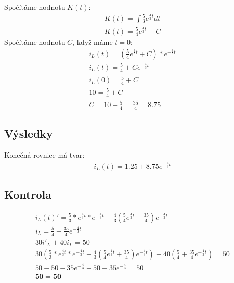 Spočítáme hodnotu $K(t)$:
\begin{gather*}
K(t) = \int \frac{5}{3}e^{\frac{4}{3}t}dt \\
K(t) = \frac{5}{4}e^{\frac{4}{3}t} + C
\end{gather*}
Spočítáme hodnotu $C$, když máme $t=0$:
\begin{gather*}
i_L(t) = (\frac{5}{4}e^{\frac{4}{3}t} + C) * e^{-\frac{4}{3}t} \\
i_L(t) = \frac{5}{4} + Ce^{-\frac{4}{3}t} \\
i_L(0) = \frac{5}{4} + C \\
10 = \frac{5}{4} + C \\
C = 10 - \frac{5}{4} = \frac{35}{4} = 8.75
\end{gather*}
\subsection{Výsledky}
Konečná rovnice má tvar:
\begin{gather*}
i_L(t) = 1.25+8.75e^{-\frac{4}{3}t}
\end{gather*}
\subsection{Kontrola}
\begin{gather*}
i_L(t)' = \frac{5}{3} * e^{\frac{4}{3}t} * e^{-\frac{4}{3}t} - \frac{4}{3}\left(\frac{5}{4}e^{\frac{4}{3}t} + \frac{35}{4}\right) e^{-\frac{4}{3}t} \\
i_L = \frac{5}{4}+\frac{35}{4}e^{-\frac{4}{3}t} \\
30i'_L + 40i_L = 50 \\
30\left(\frac{5}{3} * e^{\frac{4}{3}t} * e^{-\frac{4}{3}t} - \frac{4}{3}\left(\frac{5}{4}e^{\frac{4}{3}t} + \frac{35}{4}\right)e^{-\frac{4}{3}t}\right) + 40\left(\frac{5}{4}+\frac{35}{4}e^{-\frac{4}{3}t}\right) = 50 \\
50 - 50 - 35e^{-\frac{4}{3}} + 50 + 35e^{-\frac{4}{3}} = 50 \\
\boldsymbol{50 = 50}
\end{gather*}
